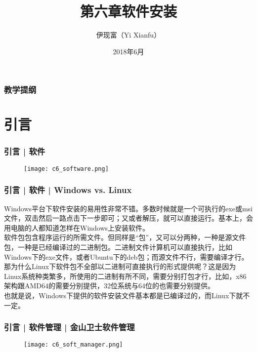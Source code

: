 



\title[软件安装]{第六章\quad 软件安装}
\author[Yixf]{伊现富（Yi Xianfu）}
\date{2018年6月}


\begin{frame}
  \titlepage
\end{frame}

\begin{frame}[plain,label=current]
  \frametitle{教学提纲}
  \setcounter{tocdepth}{3}
  \begin{multicols}{2}
    \tableofcontents
  \end{multicols}
\end{frame}


\section{引言}
\begin{frame}
  \frametitle{引言 | 软件}
  \begin{figure}
    \centering
    \texttt{[image: c6\_software.png]}
  \end{figure}
\end{frame}

\begin{frame}
  \frametitle{引言 | 软件 | Windows vs. Linux}
  Windows平台下软件安装的易用性非常不错。多数时候就是一个可执行的exe或msi文件，双击然后一路点击下一步即可；又或者解压，就可以直接运行。基本上，会用电脑的人都知道怎样在Windows上安装软件。\\
  \vspace{5pt}
  软件包包含程序运行的所需文件。但同样是“包”，又可以分两种，一种是源文件包，一种是已经编译过的二进制包。二进制文件计算机可以直接执行，比如Windows下的exe文件，或者Ubuntu下的deb包；而源文件不行，需要编译才行。那为什么Linux下软件包不全部以二进制可直接执行的形式提供呢？这是因为Linux系统种类繁多，所使用的二进制有所不同，需要分别打包才行，比如，x86架构跟AMD64的需要分别提供，32位系统与64位的也需要分别提供。\\
  \vspace{5pt}
  也就是说，Windows下提供的软件安装文件基本都是已编译过的，而Linux下就不一定。
\end{frame}

\begin{frame}
  \frametitle{引言 | 软件管理 | 金山卫士软件管理}
  \begin{figure}
    \centering
    \texttt{[image: c6\_soft\_manager.png]}
  \end{figure}
\end{frame}

